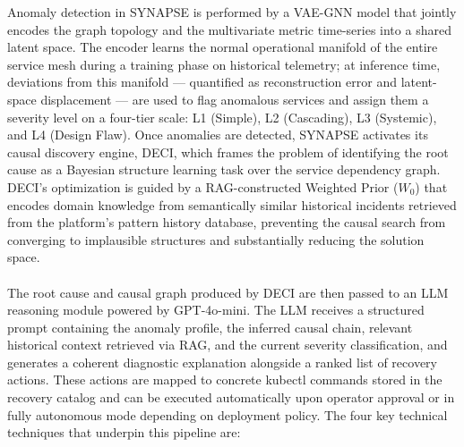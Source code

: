 \hspace*{0.3in} Anomaly detection in SYNAPSE is performed by a VAE-GNN model that jointly encodes the graph topology and the multivariate metric time-series into a shared latent space. The encoder learns the normal operational manifold of the entire service mesh during a training phase on historical telemetry; at inference time, deviations from this manifold — quantified as reconstruction error and latent-space displacement — are used to flag anomalous services and assign them a severity level on a four-tier scale: L1 (Simple), L2 (Cascading), L3 (Systemic), and L4 (Design Flaw). Once anomalies are detected, SYNAPSE activates its causal discovery engine, DECI, which frames the problem of identifying the root cause as a Bayesian structure learning task over the service dependency graph. DECI's optimization is guided by a RAG-constructed Weighted Prior ($W_0$) that encodes domain knowledge from semantically similar historical incidents retrieved from the platform's pattern history database, preventing the causal search from converging to implausible structures and substantially reducing the solution space.\\\\

\hspace*{0.3in} The root cause and causal graph produced by DECI are then passed to an LLM reasoning module powered by GPT-4o-mini. The LLM receives a structured prompt containing the anomaly profile, the inferred causal chain, relevant historical context retrieved via RAG, and the current severity classification, and generates a coherent diagnostic explanation alongside a ranked list of recovery actions. These actions are mapped to concrete kubectl commands stored in the recovery catalog and can be executed automatically upon operator approval or in fully autonomous mode depending on deployment policy. The four key technical techniques that underpin this pipeline are:\\\\

